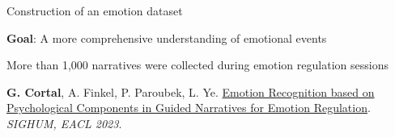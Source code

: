 \documentclass[handout,10pt]{beamer}
\begin{document}
\begin{frame}{Construction of an emotion dataset}

\textbf{Goal}: A more comprehensive understanding of emotional events

\pause

\begin{table}
    \centering
\label{tab:description_corpus}
\end{table} %

\small
More than 1,000 narratives were collected during emotion regulation sessions
\vspace{0.5cm}

\scriptsize

\textbf{G. Cortal}, A. Finkel, P. Paroubek, L. Ye. \href{https://aclanthology.org/2023.latechclfl-1.8/}{Emotion Recognition based on Psychological Components in Guided Narratives for Emotion Regulation}. \textit{SIGHUM, EACL 2023}.%
    
\end{frame}
\end{document}
